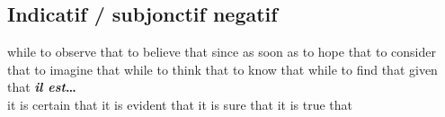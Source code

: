 \subsection*{Indicatif /{\color{myblue} subjonctif negatif}}
   {while}
   {to observe that}
   {to believe that}
   {since}
   {as soon as}
   {to hope that}
   {to consider that}
   {to imagine that}
   {while}
   {to think that}
   {to know that}
   {while}
   {to find that}
   {given that}
     {\bf {\em il est}\ldots}\\
        {it is certain that}
        {it is evident that}
        {it is sure that}
        {it is true that}



